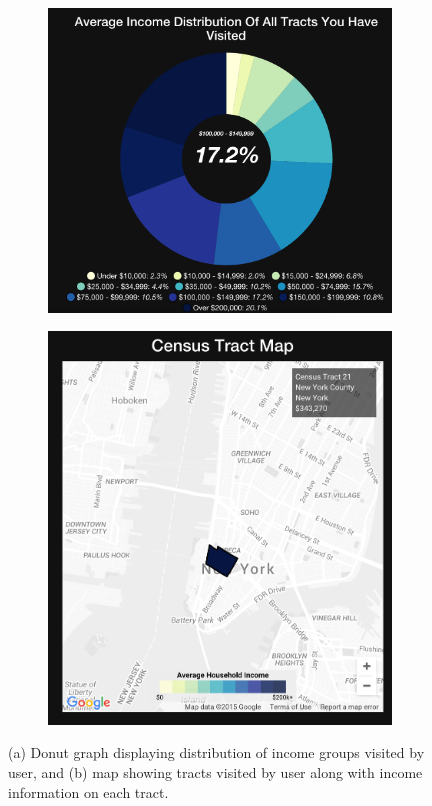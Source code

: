 \begin{figure}
  \centering
  \begin{subfigure}[b]{.48\linewidth}
    \centering
    \includegraphics[width=\linewidth]{fig/findyou/donut.png}
    \caption{}
  \end{subfigure}
  \begin{subfigure}[b]{.48\linewidth}
    \centering
    \includegraphics[width=\linewidth]{fig/findyou/tract-map.png}
    \caption{}
  \end{subfigure}
  \caption{(a) Donut graph displaying distribution of income groups visited by user, and (b) map showing tracts visited by user along with income information on each tract.}
\end{figure}

